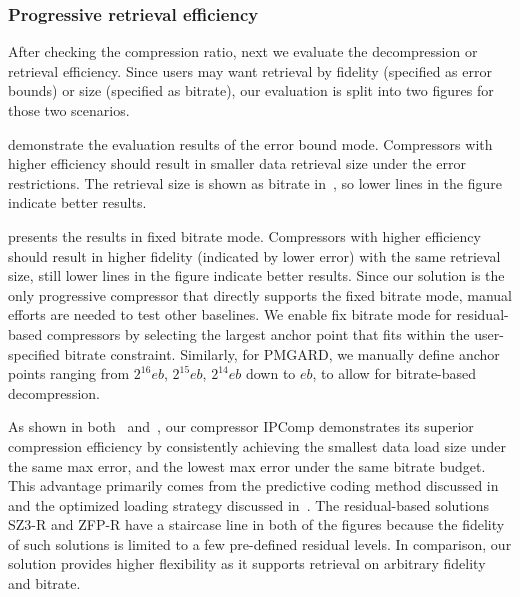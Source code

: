 \subsubsection{Progressive retrieval efficiency}
After checking the compression ratio, next we evaluate the decompression or retrieval efficiency. Since users may want retrieval by fidelity (specified as error bounds) or size (specified as bitrate), our evaluation is split into two figures for those two scenarios.

 demonstrate the evaluation results of the error bound mode. Compressors with higher efficiency should result in smaller data retrieval size under the error restrictions. The retrieval size is shown as bitrate in~, so lower lines in the figure indicate better results. 


 presents the results in fixed bitrate mode. Compressors with higher efficiency should result in higher fidelity (indicated by lower error) with the same retrieval size, still lower lines in the figure indicate better results. 
Since our solution is the only progressive compressor that directly supports the fixed bitrate mode, manual efforts are needed to test other baselines. We enable fix bitrate mode for residual-based compressors by selecting the largest anchor point that fits within the user-specified bitrate constraint. Similarly, for PMGARD, we manually define anchor points ranging from $2^{16}eb$, $2^{15}eb$, $2^{14}eb$ down to $eb$, to allow for bitrate-based decompression.

As shown in both~ and~, our compressor IPComp demonstrates its superior compression efficiency by consistently achieving the smallest data load size under the same max error, and the lowest max error under the same bitrate budget.
This advantage primarily comes from the predictive coding method discussed in~ and the optimized loading strategy discussed in~. The residual-based solutions SZ3-R and ZFP-R have a staircase line in both of the figures because the fidelity of such solutions is limited to a few pre-defined residual levels. In comparison, our solution provides higher flexibility as it supports retrieval on arbitrary fidelity and bitrate.

